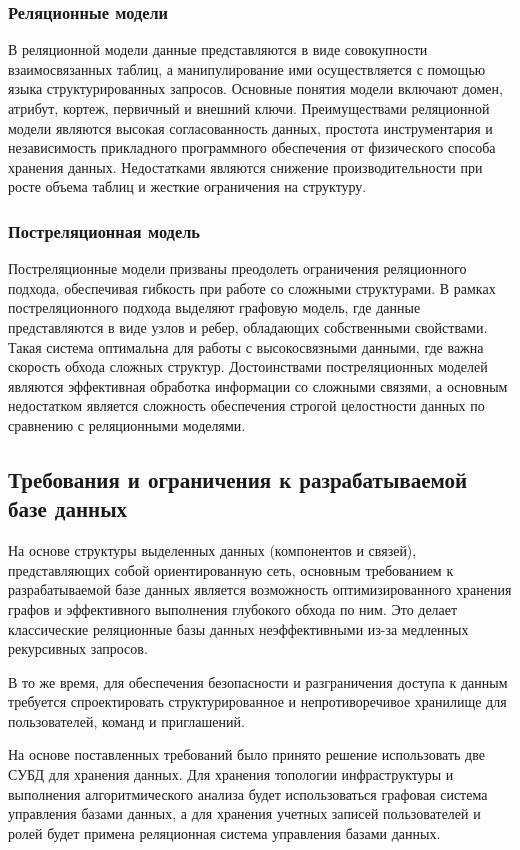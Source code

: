 \subsubsection{Реляционные модели}
В реляционной модели данные представляются в виде совокупности взаимосвязанных
таблиц, а манипулирование ими осуществляется с помощью языка структурированных
запросов. Основные понятия модели включают домен, атрибут, кортеж, первичный и
внешний ключи. Преимуществами реляционной модели являются высокая
согласованность данных, простота инструментария и независимость прикладного
программного обеспечения от физического способа хранения данных. Недостатками
являются снижение производительности при росте объема таблиц и жесткие
ограничения на структуру.

\subsubsection{Постреляционная модель}
Постреляционные модели призваны преодолеть ограничения реляционного подхода,
обеспечивая гибкость при работе со сложными структурами. В рамках
постреляционного подхода выделяют графовую модель, где данные представляются в
виде узлов и ребер, обладающих собственными свойствами. Такая система
оптимальна для работы с высокосвязными данными, где важна скорость обхода
сложных структур. Достоинствами постреляционных моделей являются эффективная
обработка информации со сложными связями, а основным недостатком является
сложность обеспечения строгой целостности данных по сравнению с реляционными моделями.

\subsection{Требования и ограничения к разрабатываемой базе данных}
На основе структуры выделенных данных (компонентов и связей), представляющих
собой ориентированную сеть, основным требованием к разрабатываемой базе данных
является возможность оптимизированного хранения графов и эффективного
выполнения глубокого обхода по ним. Это делает классические реляционные базы
данных неэффективными из-за медленных рекурсивных запросов.

В то же время, для обеспечения безопасности и разграничения доступа к данным
требуется спроектировать структурированное и непротиворечивое хранилище для
пользователей, команд и приглашений.

На основе поставленных требований было принято решение использовать две СУБД
для хранения данных. Для хранения топологии инфраструктуры и выполнения
алгоритмического анализа будет использоваться графовая система управления
базами данных, а для хранения учетных записей пользователей и ролей будет
примена реляционная система управления базами данных.

